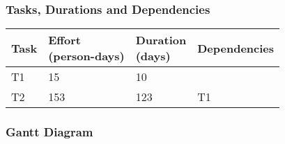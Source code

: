 \subsubsection{Tasks, Durations and Dependencies}
\lipsum[100]
\begin{center}
	\begin{tabulary}{\linewidth\tymin=70pt}{Y{2cm}|Y{2.5cm}|Y{2cm}|Y{2cm}}
		\textbf{Task} & \textbf{Effort\newline(person-days)} & \textbf{Duration\newline(days)} & \textbf{Dependencies} \\ \hline
		T1 & 15 & 10 & \\ \hline
		T2 & 153 & 123 & T1 \\
	\end{tabulary}
\end{center}
%
\subsubsection{Gantt Diagram}
\lipsum[100]
\begin{center}
	\begin{ganttchart}[hgrid=true, vgrid={*3{none}, dotted}, x unit=1.7mm]{1}{60}
		  \\
		  \\
		 \\
		 \\
		 \\
		 \\
		 \\
	\end{ganttchart}
\end{center}
%